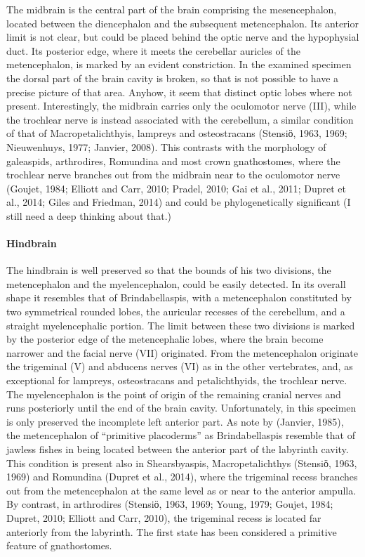 \documentclass[12pt,letterpaper]{article}
\begin{document}
The midbrain is the central part of the brain comprising the mesencephalon, located between the diencephalon and the subsequent metencephalon. Its anterior limit is not clear, but could be placed behind the optic nerve and the hypophysial duct. Its posterior edge, where it meets the cerebellar auricles of the metencephalon, is marked by an evident constriction. In the examined specimen the dorsal part of the brain cavity is broken, so that is not possible to have a precise picture of that area. Anyhow, it seem that distinct optic lobes where not present. Interestingly, the midbrain carries only the oculomotor nerve (III), while the trochlear nerve is instead associated with the cerebellum, a similar condition of that of Macropetalichthyis, lampreys and osteostracans (Stensiӧ, 1963, 1969; Nieuwenhuys, 1977; Janvier, 2008). This contrasts with the morphology of galeaspids, arthrodires, Romundina and most crown gnathostomes, where the trochlear nerve branches out from the midbrain near to the oculomotor nerve (Goujet, 1984; Elliott and Carr, 2010; Pradel, 2010; Gai et al., 2011; Dupret et al., 2014; Giles and Friedman, 2014) and could be phylogenetically significant (I still need a deep thinking about that.)

\paragraph{Hindbrain}

The hindbrain is well preserved so that the bounds of his two divisions, the metencephalon and the myelencephalon, could be easily detected. In its overall shape it resembles that of Brindabellaspis, with a metencephalon constituted by two symmetrical rounded lobes, the auricular recesses of the cerebellum, and a straight myelencephalic portion. The limit between these two divisions is marked by the posterior edge of the metencephalic lobes, where the brain become narrower and the facial nerve (VII) originated. From the metencephalon originate the trigeminal (V) and abducens nerves (VI) as in the other vertebrates, and, as exceptional for lampreys, osteostracans and petalichthyids, the trochlear nerve. The myelencephalon is the point of origin of the remaining cranial nerves and runs posteriorly until the end of the brain cavity. Unfortunately, in this specimen is only preserved the incomplete left  anterior part.
As note by (Janvier, 1985), the metencephalon of “primitive placoderms” as Brindabellaspis resemble that of jawless fishes in being located between the anterior part of the labyrinth cavity. This condition is present also in Shearsbyaspis, Macropetalichthys (Stensiӧ, 1963, 1969) and Romundina (Dupret et al., 2014), where the trigeminal recess branches out from the metencephalon at the same level as or near to the anterior ampulla. By contrast, in arthrodires (Stensiӧ, 1963, 1969; Young, 1979; Goujet, 1984; Dupret, 2010; Elliott and Carr, 2010), the trigeminal recess is located far anteriorly from the labyrinth. The first state has been considered a primitive feature of gnathostomes.
\end{document}
